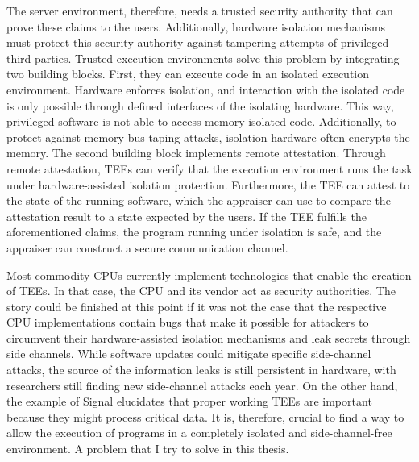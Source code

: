 The server environment, therefore, needs a trusted security authority that can
prove these claims to the users. Additionally, hardware isolation mechanisms
must protect this security authority against tampering attempts of privileged
third parties. Trusted execution environments solve this problem by integrating
two building blocks. First, they can execute code in an isolated execution
environment. Hardware enforces isolation, and interaction with the isolated code
is only possible through defined interfaces of the isolating hardware. This way,
privileged software is not able to access memory-isolated code. Additionally, to
protect against memory bus-taping attacks, isolation hardware often encrypts the
memory. The second building block implements remote attestation. Through remote
attestation, TEEs can verify that the execution environment runs the task under
hardware-assisted isolation protection. Furthermore, the TEE can attest to the
state of the running software, which the appraiser can use to compare the
attestation result to a state expected by the users. If the TEE fulfills the
aforementioned claims, the program running under isolation is safe, and the
appraiser can construct a secure communication channel.

Most commodity CPUs currently implement technologies that enable the creation of
TEEs. In that case, the CPU and its vendor act as security
authorities.\cite{tdx_whitepaper,kaplan_amd_2020,pinto_demystifying_2019,costan2016intel}
The story could be finished at this point if it was not the case that the
respective CPU implementations contain bugs that make it possible for attackers
to circumvent their hardware-assisted isolation mechanisms and leak secrets
through side
channels.\cite{kocher_spectre_2020,lipp_meltdown_2020,nilsson_survey_2020} While
software updates could mitigate specific side-channel attacks, the source of the
information leaks is still persistent in hardware, with researchers still
finding new side-channel attacks each
year.\cite{wikner2022retbleed,moghimi_downfall_2023,ragab_ghostrace_2024} On the
other hand, the example of Signal elucidates that proper working TEEs are
important because they might process critical data. It is, therefore, crucial to
find a way to allow the execution of programs in a completely isolated and
side-channel-free environment. A problem that I try to solve in this thesis.
